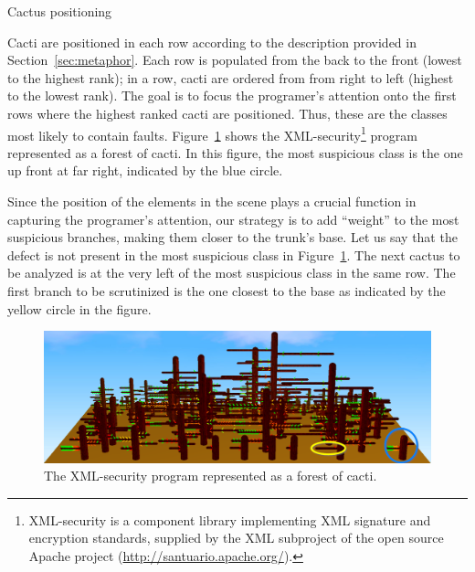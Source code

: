 \begin{algorithm}[htbp]
\BlankLine
{}
\caption{Cactus positioning}
\label{alg:positioning}
\end{algorithm}

Cacti are positioned in each row according to the description provided in
Section~\ref{sec:metaphor}. Each row is populated from the back to the front
(lowest to the highest rank); in a row, cacti are ordered from from right to
left (highest to the lowest rank). The goal is to focus the programer's
attention onto the first rows where the highest ranked cacti are positioned.
Thus, these are the classes most likely to contain faults.
Figure~\ref{fig:xml-security-metaphor} shows the
XML-security\footnote{XML-security  is a component library implementing XML
signature and encryption standards, supplied by the XML subproject of the open
source Apache project (\url{http://santuario.apache.org/}).} program represented
as a forest of cacti. In this figure, the most suspicious class is the one up
front at far right, indicated by the blue circle.

Since the position of the elements in the scene plays a crucial function in
capturing the programer's attention, our strategy is to add ``weight'' to the
most suspicious branches, making them closer to the trunk's base. Let us say
that the defect is not present in the most suspicious class in
Figure~\ref{fig:xml-security-metaphor}. The next cactus to be analyzed is at the
very  left of the most suspicious class in the same row. The first  branch to be
scrutinized is the one closest to the base as indicated by the yellow circle in
the figure.

\begin{figure}
  \centering
    \includegraphics[width=\linewidth]{figures/xml-security-metaphor.png}
  \caption{The XML-security program represented as a forest of cacti.}
  \label{fig:xml-security-metaphor}
\end{figure}

